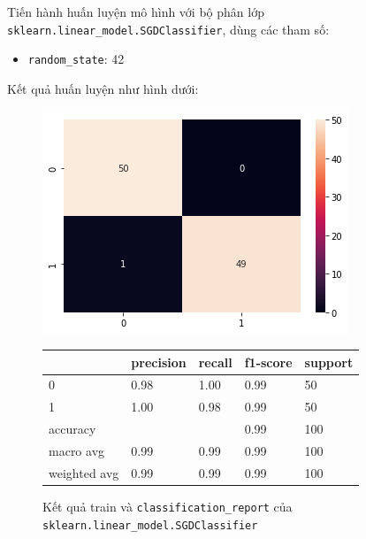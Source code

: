 \documentclass[12pt]{article}
\begin{document}
Tiến hành huấn luyện mô hình với bộ phân lớp \texttt{sklearn.linear\_model.SGDClassifier}, dùng các tham số:
\begin{itemize}
	\item \texttt{random\_state}: 42
\end{itemize}
Kết quả huấn luyện như hình dưới:
\begin{figure}[H]
	\begin{multicols}{2}
		\includegraphics[scale=.5]{img/train-sgd-result.png}

		\begin{table}[H]
			\begin{tabular}{l l l l l}
				\hline
				& precision & recall & f1-score & support \\
				\hline
				0 & 0.98 & 1.00 & 0.99 & 50 \\
				1 & 1.00 & 0.98 & 0.99 & 50 \\
				accuracy &   &   & 0.99 & 100 \\
				macro avg & 0.99 & 0.99 & 0.99 & 100 \\
				weighted avg & 0.99 & 0.99 & 0.99 & 100 \\
				\hline
			\end{tabular}
		\end{table}
	\end{multicols}
	\caption{Kết quả train và \texttt{classification\_report} của \texttt{sklearn.linear\_model.SGDClassifier}}
\end{figure}
\end{document}
